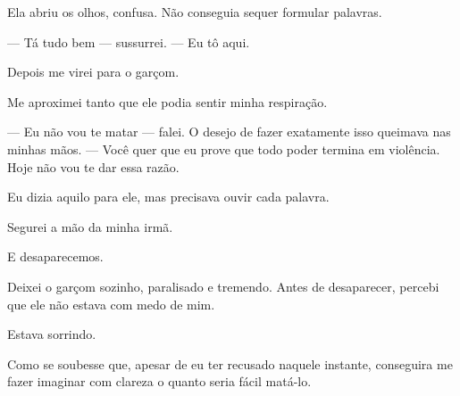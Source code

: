 Ela abriu os olhos, confusa.  
Não conseguia sequer formular palavras.

— Tá tudo bem — sussurrei. — Eu tô aqui.

Depois me virei para o garçom.

Me aproximei tanto que ele podia sentir minha respiração.

— Eu não vou te matar — falei. O desejo de fazer exatamente isso queimava nas minhas mãos. — Você quer que eu prove que todo poder termina em violência. Hoje não vou te dar essa razão.

Eu dizia aquilo para ele, mas precisava ouvir cada palavra.

Segurei a mão da minha irmã.

E desaparecemos.

Deixei o garçom sozinho, paralisado e tremendo. Antes de desaparecer, percebi que ele não estava com medo de mim.

Estava sorrindo.

Como se soubesse que, apesar de eu ter recusado naquele instante, conseguira me fazer imaginar com clareza o quanto seria fácil matá-lo.
